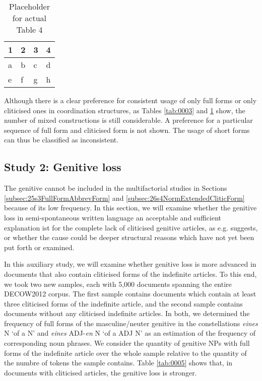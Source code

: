 \begin{table}
	\centering
	\begin{tabular}{llll}
		\toprule
		\textbf{1} & \textbf{2} & \textbf{3} & \textbf{4} \\
		\midrule
		a & b & c & d \\
		e & f & g & h \\
		\bottomrule
	\end{tabular}
	\caption{Placeholder for actual Table 4}
	\label{tab:0004}
\end{table}

Although there is a clear preference for consistent usage of only full forms or only cliticised ones in coordination structures, as Tables \ref{tab:0003} and \ref{tab:0004} show, the number of mixed constructions is still considerable.
A preference for a particular sequence of full form and cliticised form is not shown.
The usage of short forms can thus be classified as inconsistent.

\subsection{Study 2: Genitive loss}
\label{subsec:24s2GenLoss}

The genitive cannot be included in the multifactorial studies in Sections \ref{subsec:25s3FullFormAbbrevForm} and \ref{subsec:26s4NormExtendedCliticForm} because of its low frequency.
In this section, we will examine whether the genitive loss in semi-spontaneous written language an acceptable and sufficient explanation ist for the complete lack of cliticised genitive articles, as e.g. \citet[5]{Burri2003} suggests, or whether the cause could be deeper structural reasons which have not yet been put forth or examined.

In this auxiliary study, we will examine whether genitive loss is more advanced in documents that also contain cliticised forms of the indefinite articles. %
To this end, we took two new samples, each with 5,000 documents spanning the entire DECOW2012 corpus.
The first sample contains documents which contain at least three cliticised forms of the indefinite article, and the second sample contains documents without any cliticised indefinite articles.
In both, we determined the frequency of full forms of the masculine/neuter genitive in the constellations \textit{eines} N `of a N' and \textit{eines} ADJ-\textit{en} N `of a ADJ N' as an estimation of the frequency of corresponding noun phrases. %
We consider the quantity of genitive NPs with full forms of the indefinite article over the whole sample relative to the quantity of the numbre of tokens the sample contains.
Table \ref{tab:0005} shows that, in documents with cliticised articles, the genitive loss is stronger.

